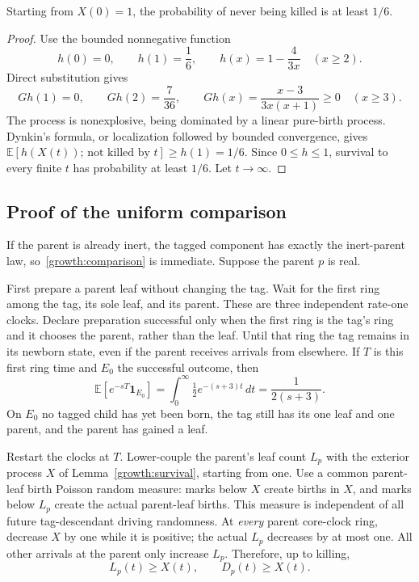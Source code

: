 \begin{lemma}\label{growth:survival}
Starting from $X(0)=1$, the probability of never being killed is at least
$1/6$.
\end{lemma}
\begin{proof}
Use the bounded nonnegative function
\[
 h(0)=0,\qquad h(1)=\frac16,\qquad
 h(x)=1-\frac4{3x}\quad(x\ge2).
\]
Direct substitution gives
\[
 Gh(1)=0,\qquad Gh(2)=\frac7{36},\qquad
 Gh(x)=\frac{x-3}{3x(x+1)}\ge0\quad(x\ge3).
\]
The process is nonexplosive, being dominated by a linear pure-birth
process. Dynkin's formula, or localization followed by bounded
convergence, gives
$\mathbb E[h(X(t));\,\text{not killed by }t]\ge h(1)=1/6$.
Since $0\le h\le1$, survival to every finite $t$ has probability at least
$1/6$. Let $t\to\infty$.
\end{proof}

\subsection{Proof of the uniform comparison}

If the parent is already inert, the tagged component has exactly the
inert-parent law, so~\eqref{growth:comparison} is immediate.
Suppose the parent $p$ is real.

First prepare a parent leaf without changing the tag. Wait for the first
ring among the tag, its sole leaf, and its parent. These are three
independent rate-one clocks. Declare preparation successful only when
the first ring is the tag's ring and it chooses the parent, rather than
the leaf. Until that ring the tag remains in its newborn state, even
if the parent receives arrivals from elsewhere. If $T$ is this first
ring time and $E_0$ the successful outcome, then
\begin{equation}\label{growth:preparation}
 \mathbb E[e^{-sT}\mathbf1_{E_0}]
 =\int_0^\infty \tfrac12 e^{-(s+3)t}\,dt
 =\frac1{2(s+3)}.
\end{equation}
On $E_0$ no tagged child has yet been born, the tag still has its one
leaf and one parent, and the parent has gained a leaf.

Restart the clocks at $T$. Lower-couple the parent's leaf count $L_p$
with the exterior process $X$ of Lemma~\ref{growth:survival}, starting
from one. Use a common parent-leaf birth Poisson random measure:
marks below $X$ create births in $X$, and marks below $L_p$ create the
actual parent-leaf births. This measure is independent of all future
tag-descendant driving randomness. At \emph{every} parent core-clock
ring, decrease $X$ by one while it is positive; the actual $L_p$
decreases by at most one. All other arrivals at the parent only increase
$L_p$. Therefore, up to killing,
\[
 L_p(t)\ge X(t),\qquad D_p(t)\ge X(t).
\]

